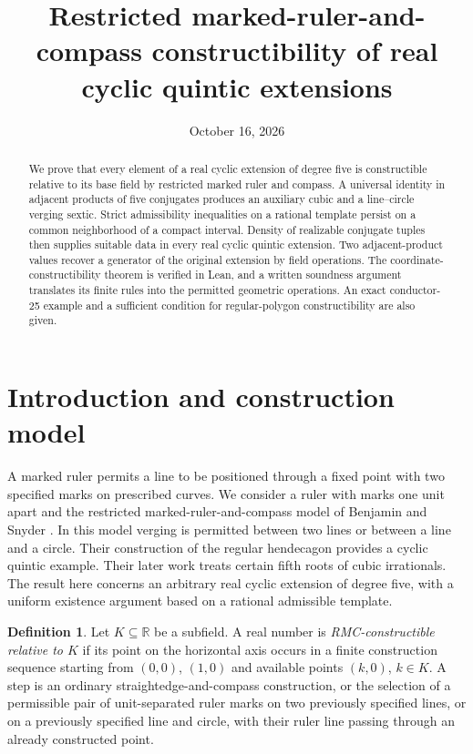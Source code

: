\documentclass[noproofs]{rmj-public}
\title[Real cyclic quintic extensions]{Restricted marked-ruler-and-compass constructibility of real cyclic quintic extensions}
\author{}
\date{October 16, 2026}
\theoremstyle{definition}
\newtheorem{definition}[thm]{Definition}
\numberwithin{equation}{section}
\newcommand{\R}{\mathbb R}
\begin{document}
\begin{abstract}
We prove that every element of a real cyclic extension of degree five is
constructible relative to its base field by restricted marked ruler and
compass. A universal identity in adjacent products of five conjugates
produces an auxiliary cubic and a line--circle verging sextic. Strict
admissibility inequalities on a rational template persist on a common
neighborhood of a compact interval. Density of realizable conjugate tuples
then supplies suitable data in every real cyclic quintic extension.
Two adjacent-product values recover a generator of the original extension
by field operations. The coordinate-constructibility theorem is verified
in Lean, and a written soundness argument translates its finite rules into
the permitted geometric operations. An exact conductor-25 example and a
sufficient condition for regular-polygon constructibility are also given.
\end{abstract}
\maketitle

\section{Introduction and construction model}\label{sec:intro}

A marked ruler permits a line to be positioned through a fixed point with
two specified marks on prescribed curves. We consider a ruler with marks
one unit apart and the restricted marked-ruler-and-compass model of
Benjamin and Snyder \cite{BS14,BS16}. In this model verging is permitted
between two lines or between a line and a circle. Their construction of the
regular hendecagon \cite{BS14} provides a cyclic quintic example. Their later
work \cite{BS16} treats certain fifth roots of cubic irrationals. The result
here concerns an arbitrary real cyclic extension of degree five, with a
uniform existence argument based on a rational admissible template.

\begin{definition}\label{def:rmc}
Let $K\subseteq\R$ be a subfield. A real number is \emph{RMC-constructible
relative to $K$} if its point on the horizontal axis occurs in a finite
construction sequence starting from $(0,0)$, $(1,0)$ and available points
$(k,0)$, $k\in K$. A step is an ordinary straightedge-and-compass
construction, or the selection of a permissible pair of unit-separated
ruler marks on two previously specified lines, or on a previously
specified line and circle, with their ruler line passing through an
already constructed point.
\end{definition}
\end{document}
